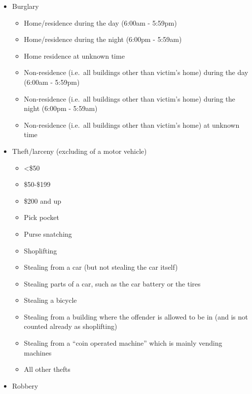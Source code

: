 \documentclass[
]{krantz}
\providecommand{\tightlist}{%
  \setlength{\itemsep}{0pt}\setlength{\parskip}{0pt}}
\begin{document}
\begin{itemize}
\tightlist
\item
  Burglary

  \begin{itemize}
  \tightlist
  \item
    Home/residence during the day (6:00am - 5:59pm)
  \item
    Home/residence during the night (6:00pm - 5:59am)
  \item
    Home residence at unknown time
  \item
    Non-residence (i.e.~all buildings other than victim's
    home) during the day (6:00am - 5:59pm)
  \item
    Non-residence (i.e.~all buildings other than victim's
    home) during the night (6:00pm - 5:59am)
  \item
    Non-residence (i.e.~all buildings other than victim's
    home) at unknown time
  \end{itemize}
\item
  Theft/larceny (excluding of a motor vehicle)

  \begin{itemize}
  \tightlist
  \item
    \textless\$50
  \item
    \$50-\$199
  \item
    \$200 and up
  \item
    Pick pocket
  \item
    Purse snatching
  \item
    Shoplifting
  \item
    Stealing from a car (but not stealing the car itself)
  \item
    Stealing parts of a car, such as the car battery or the
    tires
  \item
    Stealing a bicycle
  \item
    Stealing from a building where the offender is allowed
    to be in (and is not counted already as shoplifting)
  \item
    Stealing from a ``coin operated machine'' which is
    mainly vending machines
  \item
    All other thefts
  \end{itemize}
\item
  Robbery


\end{itemize}
\end{document}
